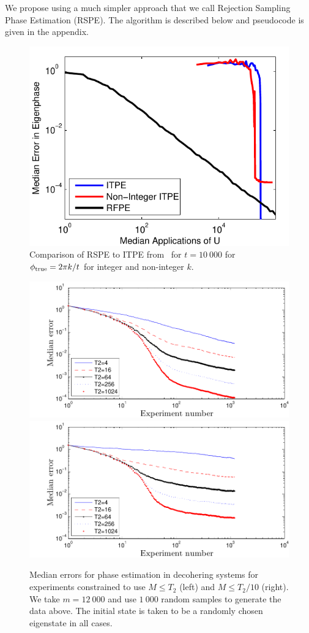 \documentclass[aps,pra,amsmath,twocolumn,amssymb,superscriptaddress]{revtex4-1}
\begin{document}
We
propose using a much simpler approach that we call Rejection Sampling Phase Estimation (RSPE).  The algorithm is described below and pseudocode is given in the appendix.
\begin{figure}[t!]
    \begin{centering}
        \includegraphics[width=0.723\linewidth]{ITPEcmp.pdf}
    \end{centering}
    \caption{\label{fig:ITPEcmp}
     Comparison of RSPE to ITPE from~\cite{SHF14} for $t=10~000$ for $\phi_{\rm true} = 2\pi k/t$ for integer and non-integer $k$.
    }
\end{figure}



\begin{figure}
    \begin{centering}
\includegraphics[width=0.45\linewidth]{T2plot_full.pdf}
        \includegraphics[width=0.45\linewidth]{T2plot.pdf}
    \end{centering}
    \caption{\label{fig:T2plot}
Median errors for phase estimation in decohering systems for experiments constrained to use $M\le T_2$ (left) and $M\le T_2/10$ (right).  We take $m=12~000$ and use $1~000$ random samples to generate the data above.  The initial state is taken to be a randomly chosen eigenstate in all cases.
    }
\end{figure}
\end{document}
